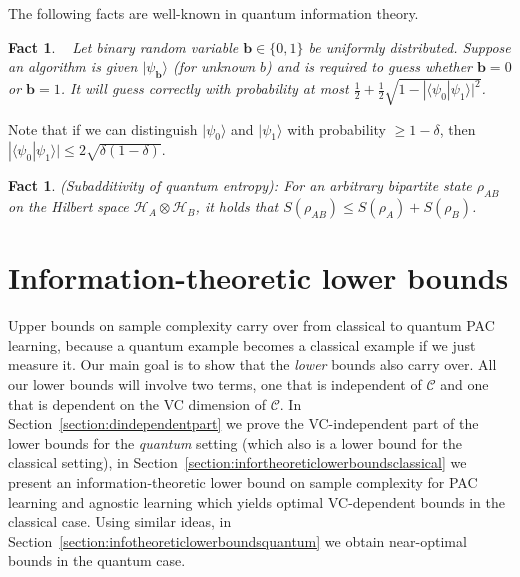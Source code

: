 \documentclass[twoside,11pt]{article}
\newcommand{\eps}{\varepsilon}
\newcommand{\ket}[1]{|#1\rangle}
\newcommand{\ip}[2]{\langle #1 | #2 \rangle}
\newcommand{\A}{\ensuremath{\mathcal{A}}}
\newcommand{\Hi}{\ensuremath{\mathcal{H}}}
\newtheorem{fact}[theorem]{Fact}
\def\01{\{0,1\}}
\newcommand{\C}{\ensuremath{\mathscr{C}}}
\begin{document}
The following facts are well-known in quantum information theory.
\begin{fact}~\cite[Appendix~A.9]{kaye:introbook}
	\label{fact:2statedistinguishingbound}
	Let binary random variable $\mathbf{b}\in\01$ be uniformly distributed. Suppose an algorithm is given $\ket{\psi_{\mathbf{b}}}$ (for unknown $b$) and is required to guess whether $\mathbf{b}=0$ or $\mathbf{b}=1$. It will guess correctly with probability at most $\frac{1}{2}+\frac{1}{2}\sqrt{1-|\ip{\psi_0}{\psi_1}|^2}$.
\end{fact}

Note that if we can distinguish $\ket{\psi_0}$ and $\ket{\psi_1}$ with probability $\geq 1-\delta$, then $|\ip{\psi_0}{\psi_1}|\leq 2\sqrt{\delta(1-\delta)}$.

\begin{fact}
	\label{fact:quantumsubadditivity}
	(Subadditivity of quantum entropy): For an arbitrary bipartite state $\rho_{AB}$ on the Hilbert space $\Hi_A\otimes \Hi_B$, it holds that $S(\rho_{AB})\leq S(\rho_A)+S(\rho_B)$.
\end{fact}



\section{Information-theoretic lower bounds}
\label{section:infotheorylowerbounds}

Upper bounds on sample complexity carry over from classical to quantum PAC learning, because a quantum example becomes a classical example if we just measure it. Our main goal is to show that the \emph{lower} bounds also carry over. All our lower bounds will involve two terms, one that is independent of  $\C$ and one that is dependent on the VC dimension of $\C$. In Section~\ref{section:dindependentpart} we prove the VC-independent part of the lower bounds for the \emph{quantum} setting (which also is a lower bound for the classical setting), in Section~\ref{section:infortheoreticlowerboundsclassical} we present an information-theoretic lower bound on sample complexity for PAC learning and agnostic learning which yields optimal VC-dependent bounds in the classical case. Using similar ideas, in Section~\ref{section:infotheoreticlowerboundsquantum} we obtain near-optimal bounds in the quantum case.
\end{document}
